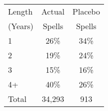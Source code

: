 \begin{tabular}{lcc}
\toprule
Length & Actual & Placebo \\
(Years) & Spells & Spells \\
\midrule
1 & 26\% & 34\% \\
2 & 19\% & 24\% \\
3 & 15\% & 16\% \\
4+ & 40\% & 26\% \\
Total &       34,293 &          913 \\
\bottomrule
\end{tabular}
